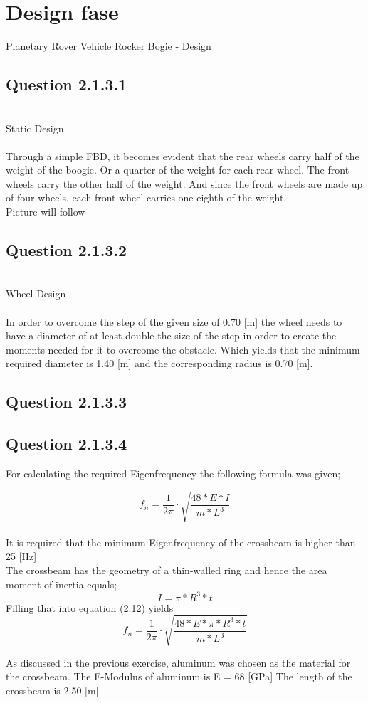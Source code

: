 \chapter{Design fase}
\label{chapter:design}

    Planetary Rover Vehicle Rocker Bogie - Design

\section{Question 2.1.3.1}
\\
     Static Design
     \\
     \\
     Through a simple FBD, it becomes evident that the rear wheels carry half of the weight of the boogie. Or a quarter of the weight for each rear wheel. The front wheels carry the other half of the weight. And since the front wheels are made up of four wheels, each front wheel carries one-eighth of the weight.
     \\
     Picture will follow
     \\
\section{Question 2.1.3.2}
\\
     Wheel Design
     \\
     \\
     In order to overcome the step of the given size of 0.70 [m] the wheel needs to have a diameter of at least double the size of the step in order to create the moments needed for it to overcome the obstacle. Which yields that the minimum required diameter is 1.40 [m] and the corresponding radius is 0.70 [m].
     \\
\section{Question 2.1.3.3}
\section{Question 2.1.3.4}
For calculating the required Eigenfrequency the following formula was given;

\begin{equation} \label{naturalfreq}
    f_n= \frac{1}{2\pi} \cdot \sqrt{\frac{48*E*I}{m*L^3}}
\end{equation}
\\
It is required that the minimum Eigenfrequency of the crossbeam is higher than 25 [Hz]
\\
The crossbeam has the geometry of a thin-walled ring and hence the area moment of inertia equals;
\begin{equation} 
    I = \pi * R^3 * t 
\end{equation}
Filling that into equation (2.12) yields 
\begin{equation} \label{naturalfreq}
    f_n= \frac{1}{2\pi} \cdot \sqrt{\frac{48*E*\pi * R^3 * t }{m*L^3}}
\end{equation}

As discussed in the previous exercise, aluminum was chosen as the material for the crossbeam. The E-Modulus of aluminum is E = 68 [GPa]
The length of the crossbeam is 2.50 [m]